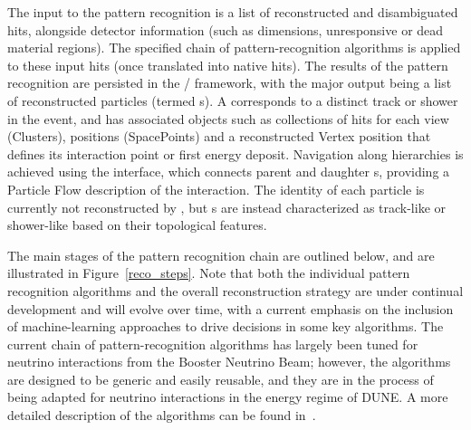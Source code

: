 

The input to the  pattern recognition is a list of reconstructed and disambiguated \twod hits, alongside detector information (such as dimensions, unresponsive or dead material regions). The specified chain of pattern-recognition algorithms is applied to these input hits (once translated into native  \twod hits). The results of the pattern recognition are persisted in the / framework, with the major output being a list of reconstructed \threed particles (termed s). A  corresponds to a distinct track or shower in the event, and has associated objects such as collections of \twod hits for each view (Clusters), \threed positions (SpacePoints) and a reconstructed Vertex position that defines its interaction point or first energy deposit. Navigation along  hierarchies is achieved using the  interface, which connects parent and daughter s, providing a Particle Flow description of the interaction. The identity of each particle is currently not reconstructed by , but s are instead characterized as track-like or shower-like based on their topological features. 

The main stages of the  pattern recognition chain are outlined below, and are illustrated in Figure~\ref{reco_steps}. Note that both the individual pattern recognition algorithms and the overall reconstruction strategy are under continual development and will evolve over time, with a current emphasis %
on the inclusion of machine-learning approaches to drive decisions in some key algorithms. The current chain of pattern-recognition algorithms has largely been tuned for neutrino interactions from the \fnal Booster Neutrino Beam; however, the algorithms are designed to be generic and easily reusable, and they are in the process of being adapted for neutrino interactions in the energy regime of DUNE. A more detailed description of the algorithms can be found in~\cite{Acciarri:2017hat}. 


